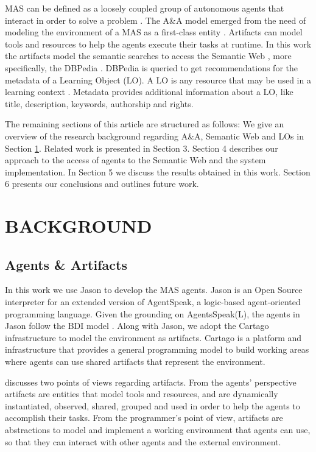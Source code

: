 \documentclass[a4paper,twoside]{article}
\begin{document}
MAS can be defined as a loosely coupled group of autonomous agents that interact in order to solve a problem \cite{ref36}. The A\&A model emerged from the need of modeling the environment of a MAS as a first-class entity \cite{ref7,ref78,ref10,ref3}. Artifacts can model tools and resources to help the agents execute their tasks at runtime. In this work the artifacts model the semantic searches to access the Semantic Web \cite{refOPQ}, more specifically, the DBPedia \cite{refXYZ}. DBPedia is queried to get recommendations for the metadata of a Learning Object (LO). A LO is any resource that may be used in a learning context \cite{ref40}. Metadata provides additional information about a LO, like title, description, keywords, authorship and rights.

The remaining sections of this article are structured as follows: We give an overview of the research background regarding A\&A, Semantic Web and LOs in Section  \ref{sec:background}. Related work is presented in Section 3. Section 4 describes our approach to the access of agents to the Semantic Web and the system implementation. In Section 5 we discuss the results obtained in this work. Section 6 presents our conclusions and outlines future work.


\section{\uppercase{Background}}
\label{sec:background}

\subsection{Agents \& Artifacts}

\noindent In this work we use Jason to develop the MAS agents. Jason \cite{ref35} is an Open Source interpreter for an extended version of AgentSpeak, a logic-based agent-oriented programming language. Given the grounding on AgentsSpeak(L), the agents in Jason follow the BDI model \cite{ref20}. Along with Jason, we adopt the Cartago \cite{refCartago} infrastructure to model the environment as artifacts. Cartago is a platform and infrastructure that provides a general programming model to build working areas where agents can use shared artifacts that represent the environment.

\cite{ref5} discusses two points of views regarding artifacts. From the agents' perspective artifacts are entities that model tools and resources, and are dynamically instantiated, observed, shared, grouped and used in order to help the agents to accomplish their tasks. From the programmer's point of view, artifacts are abstractions to model and implement a working environment that agents can use, so that they can interact with other agents and the external environment.
\end{document}
